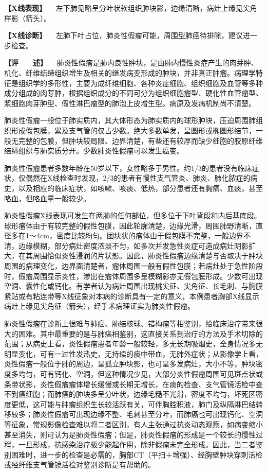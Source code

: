 \textbf{【X线表现】}
　左下肺见略呈分叶状软组织肿块影，边缘清晰，病灶上缘见尖角样影（箭头）。

\textbf{【X线诊断】}
　左肺下叶占位，肺炎性假瘤可能，周围型肺癌待排除，建议进一步检查。

\textbf{【评　　述】}
　肺炎性假瘤是肺内良性肿块，是由肺内慢性炎症产生的肉芽肿、机化、纤维结缔组织增生及相关的继发病变形成的肿块，并非真正肿瘤。病理学特征是组织学的多形性，主要为成纤维细胞、各种炎症细胞、组织细胞及血管等多种成分组成的肉芽肿，根据组织成分的不同可分为组织细胞瘤型、硬化性血管瘤型、浆细胞肉芽肿型、假性淋巴瘤型的肺泡上皮增生型。病原及发病机制尚不清楚。

肺炎性假瘤一般位于肺实质内，其大体形态为肺实质内的球形肿块，压迫周围肺组织形成假包膜，累及支气管的仅占少数。绝大多数单发，呈圆形或椭圆形结节，一般无完整的包膜，但肿块较局限、边界清楚，有些还有较厚而缺少细胞的胶原纤维结缔组织与肺实质分开。少数肺炎性假瘤可以发生癌变。

肺炎性假瘤患者多数年龄在50岁以下，女性略多于男性。约1/3的患者没有临床症状，仅偶然在X线检查时发现，2/3的患者有慢性支气管炎、肺炎、肺化脓症的病史，以及相应的临床症状，如咳嗽、咳痰、低热，部分患者还有胸痛、血痰，甚至咯血，但咯血量一般较少。

肺炎性假瘤X线表现可发生在两肺的任何部位，但多位于下叶背段和内后基底段。球形瘤体由于有较完整的假性包膜，因此轮廓清楚，边缘光滑，周围肺野清晰，直径多在1～4cm，密度比较均匀。团块状的瘤体由于假包膜不完整，一般边界不清，边缘模糊，部分病灶密度浓淡不匀，如多次并发急性炎症可造成病灶阴影扩大，在其周围恰似炎性浸润的片状影。因此，肺炎性假瘤边缘清楚与否取决于肿块周围的病理变化，边界面清楚者，瘤体周围一般有假性包膜；若病灶处于急性阶段时，假瘤周围显示炎性，渗出在瘤体周围多呈模糊影亦无假包膜形成。少数可出现空洞、囊性化或钙化。有学者认为病灶周围出现桃尖征、尖角征、长毛刺、与胸膜紧贴或有粘连带等X线征象对本病的诊断具有一定的意义，本例患者胸部X线显示病灶上缘见尖角征（箭头），经手术病理证实为肺炎性假瘤。

肺炎性假瘤在诊断上很难与肺癌、肺结核球、错构瘤等相鉴别，给临床治疗带来很大的困难。其中最重要的是与肺癌相鉴别，这直接关系到治疗的方法及手术切除的范围；从病史上看，炎性假瘤患者年龄一般较轻，多无长期吸烟史，全身情况多无明显变化，可有一过性发热史，无持续的痰中带血，无肺外症状；从影像学上看，炎性假瘤一般位于肺的周边，呈孤立肿块影，也可呈多发病灶，大小不等，肿块密度多均匀，可有钙化、空洞，但这种情况少见，大部分炎性假瘤周围可见斑点状或条带状影，炎性假瘤瘤体增长缓慢或长期无增长，在痰的检查、支气管镜活检中查不到癌细胞；而肺癌的肿块多呈分叶状，边缘毛糙不光滑，密度不均匀，坏死区密度更低，这可能与肿瘤组织生长较活跃有关，可伴胸腔积液，肺门及纵隔淋巴结转移较多；肺炎性假瘤可出现边缘不整、毛刺甚至分叶，而肺癌也可出现钙化、空洞等征象，常规影像检查难以将二者区别，有人主张通过抗炎动态观察，如病变缩小甚至消失，则可认为是肺炎性假瘤；但是，肺炎性假瘤的形成是一个较长的慢性过程，一旦形成，抗感染治疗极少能起作用，除非假瘤未完全形成。因此，当二者鉴别困难时，进一步的检查是必需的，胸部CT（平扫＋增强）、经胸壁肿块穿刺活检或经纤维支气管镜活检对鉴别诊断是有帮助的。

